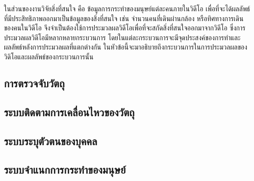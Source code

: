 ในส่วนของงานวิจัยสิ่งที่สนใจ คือ ข้อมูลการกระทำของมนุษย์แต่ละคนภายในวิดีโอ เพื่อที่จะได้ผลลัพธ์ที่มีประสิทธิภาพออกมาเป็นข้อมูลของสิ่งที่สนใจ เช่น จำนวนคนที่เดินผ่านกล้อง 
หรือทิศทางการเดินของคนในวิดีโอ จึงจำเป็นต้องใช้การประมวลผลวิดีโอเพื่อที่จะสกัดสิ่งที่สนใจออกมาจากวิดีโอ ซึ่งการประมวลผลวิดีโอมีหลากหลายกระบวนการ 
โดยในแต่ละกระบวนการจะมีจุดประสงค์ของการทำและผลลัพธ์หลังการประมวลผลที่แตกต่างกัน ในหัวข้อนี้จะมาอธิบายถึงกระบวนการในการประมวลผลของวิดิโอและผลลัพธ์ของกระบวนการนั้น
\subsection{การตรวจจับวัตถุ}


\subsection{ระบบติดตามการเคลื่อนไหวของวัตถุ}


\subsection{ระบบระบุตัวตนของบุคคล}


\subsection{ระบบจำแนกการกระทำของมนุษย์}
